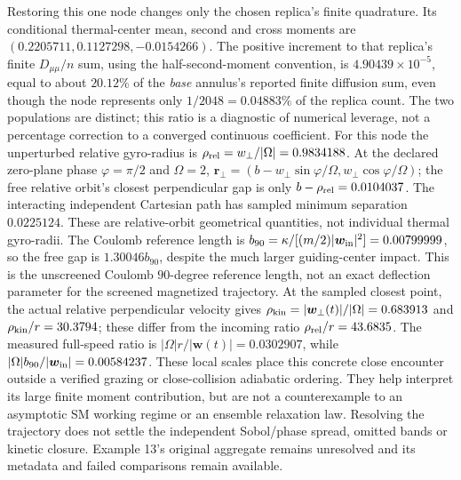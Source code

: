 \documentclass[11pt,letterpaper]{article}
\begin{document}
Restoring this one node changes only the chosen replica's finite quadrature.
Its conditional thermal-center mean, second and cross moments are
$(0.2205711,0.1127298,-0.0154266)$. The positive increment to that replica's
finite $D_{\mu\mu}/n$ sum, using the half-second-moment convention, is
$4.90439\times10^{-5}$, equal to about
$20.12\%$ of the \emph{base} annulus's reported finite diffusion sum, even
though the node represents only $1/2048=0.04883\%$ of the replica count.
The two populations are distinct; this ratio is a diagnostic of numerical
leverage, not a percentage correction to a converged continuous coefficient.
For this node the unperturbed relative gyro-radius is
$\rho_{\rm rel}=w_\perp/|\Omega|=0.9834188$.
At the declared zero-plane phase $\varphi=\pi/2$ and $\Omega=2$,
$\bm r_\perp=(b-w_\perp\sin\varphi/\Omega,
              w_\perp\cos\varphi/\Omega)$;
the free relative orbit's closest perpendicular gap is only
$b-\rho_{\rm rel}=0.0104037$. The interacting independent Cartesian path
has sampled minimum separation $0.0225124$. These are relative-orbit
geometrical quantities, not individual thermal gyro-radii. The Coulomb reference length is
$b_{90}=\kappa/[(m/2)|\bm w_{\rm in}|^2]=0.00799999$,
so the free gap is $1.30046b_{90}$, despite the much larger guiding-center
impact. This is the unscreened Coulomb $90$-degree reference length, not an
exact deflection parameter for the screened magnetized trajectory.
At the sampled closest point, the actual relative perpendicular velocity
gives $\rho_{\rm kin}=|\bm w_\perp(t)|/|\Omega|=0.683913$ and
$\rho_{\rm kin}/r=30.3794$; these differ from the incoming ratio
$\rho_{\rm rel}/r=43.6835$. The measured full-speed ratio is
$|\Omega|r/|\bm w(t)|=0.0302907$, while
$|\Omega|b_{90}/|\bm w_{\rm in}|=0.00584237$.
These local scales place this concrete close encounter outside a verified
grazing or close-collision adiabatic ordering. They help interpret its large
finite moment contribution, but are not a counterexample to an asymptotic
SM working regime or an ensemble relaxation law.
Resolving the trajectory does not settle the independent Sobol/phase spread,
omitted bands or kinetic closure. Example 13's original aggregate remains
unresolved and its metadata and failed comparisons remain available.
\end{document}

